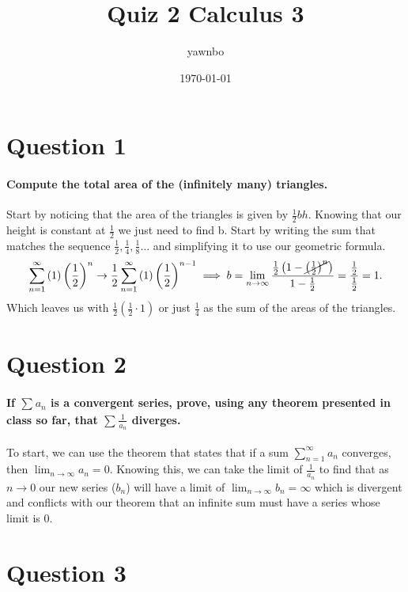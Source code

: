 \documentclass[a4paper]{article}
\title{Quiz 2 Calculus 3}
\author{yawnbo}
\date{\today}
\begin{document}
\maketitle
\section*{Question 1 }%
\paragraph{Compute the total area of the (infinitely many) triangles.\\}
Start by noticing that the area of the triangles is given by $ \frac{ 1 }{ 2 } bh $. Knowing that our height is constant at $ \frac{ 1 }{ 2 }  $ we just need to find b. Start by writing the sum that matches the sequence $ \frac{ 1 }{ 2 } ,\frac{ 1 }{ 4 },\frac{ 1 }{ 8 } \ldots $ and simplifying it to use our geometric formula. 
\[
	\sum_{ n=1 } ^{ \infty } \left( 1 \right) \left( \frac{ 1 }{ 2 }  \right) ^{ n }\to \frac{ 1 }{ 2 } \sum_{ n=1 } ^{ \infty } \left( 1 \right) \left( \frac{ 1 }{ 2 }  \right) ^{ n-1 } \implies b = \lim_{ n \to \infty} \frac{ \frac{ 1 }{ 2 }\left( 1- \cancel{ \left(  \frac{ 1 }{ 2 } \right) ^{ n }}\right)  }{ 1-\frac{ 1 }{ 2 }  }=\frac{ \frac{ 1 }{ 2 }  }{ \frac{ 1 }{ 2 }  }=1
.\] 
Which leaves us with $ \frac{ 1 }{ 2 } \left( \frac{ 1 }{ 2 }   \cdot 1 \right)  $ or just $ \frac{ 1 }{ 4 }  $ as the sum of the areas of the triangles.
\section*{Question 2 }%
\paragraph{If $ \sum_{  } ^{  } a_n $ is a convergent series, prove, using any theorem presented in class so far, that $ \sum_{  } ^{  } \frac{ 1 }{ a_n }  $ diverges. \\}

To start, we can use the theorem that states that if a sum $ \sum_{ n=1 } ^{ \infty } a_n $ converges, then $ \lim_{ n \to \infty} a_n=0 $. Knowing this, we can take the limit of $ \frac{ 1 }{ a_n }  $ to find that as $ n \to 0 $ our new series ($ b_n $) will have a limit of $ \lim_{ n \to \infty} b_n=\infty $ which is divergent and conflicts with our theorem that an infinite sum must have a series whose limit is 0.
\newpage
\section*{Question 3 }%
\end{document}
